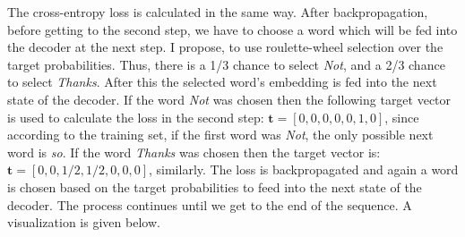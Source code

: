 \documentclass[12pt]{article}
\begin{document}
The cross-entropy loss is calculated in the same way. After backpropagation, before getting to the second step, we have to choose a word which will be fed into the decoder at the next step. I propose, to use roulette-wheel selection over the target probabilities. Thus, there is a 1/3 chance to select \textit{Not}, and a 2/3 chance to select \textit{Thanks}. After this the selected word's embedding is fed into the next state of the decoder. If the word \textit{Not} was chosen then the following target vector is used to calculate the loss in the second step: \(\bm t=[0, 0, 0, 0, 0, 1, 0]\), since according to the training set, if the first word was \textit{Not}, the only possible next word is \textit{so}. If the word \textit{Thanks} was chosen then the target vector is: \(\bm t=[0, 0, 1/2, 1/2, 0, 0, 0]\), similarly. The loss is backpropagated and again a word is chosen based on the target probabilities to feed into the next state of the decoder. The process continues until we get to the end of the sequence. A visualization is given below.

	
\end{document}
